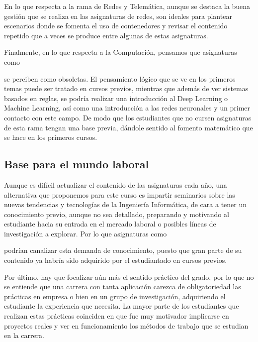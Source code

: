 En lo que respecta a la rama de Redes y Telemática,
aunque se destaca la buena gestión que se realiza en las asignaturas de redes,
son ideales para plantear escenarios donde se fomenta el uso de contenedores y
revisar el contenido repetido que
a veces se produce entre algunas de estas asignaturas.

Finalmente, en lo que respecta a la Computación,
pensamos que asignaturas como \subject{Sistemas inteligentes}
se perciben como obsoletas.
El pensamiento lógico que se ve en los primeros temas
puede ser tratado en cursos previos,
mientras que además de ver sistemas basados en reglas,
se podría realizar una introducción al Deep Learning o Machine Learning,
así como una introducción a las redes neuronales y
un primer contacto con este campo.
De modo que los estudiantes que no cursen asignaturas de esta rama
tengan una base previa,
dándole sentido al fomento matemático que se hace en los primeros cursos.

\subsection{Base para el mundo laboral}

Aunque es difícil actualizar el contenido de las asignaturas cada año,
una alternativa que proponemos para este curso es
impartir seminarios sobre las nuevas tendencias y tecnologías
de la Ingeniería Informática,
de cara a tener un conocimiento previo, aunque no sea detallado,
preparando y motivando al estudiante hacia su entrada en el mercado laboral o
posibles líneas de investigación a explorar.
Por lo que asignaturas como
\subject{Tecnologías Específicas de la Ingeniería Informática (TEII)}
podrían canalizar esta demanda de conocimiento,
puesto que gran parte de su contenido ya habría sido adquirido
por el estudiantado en cursos previos.

Por último, hay que focalizar aún más el sentido práctico del grado,
por lo que no se entiende que una carrera con tanta aplicación
carezca de obligatoriedad las prácticas en empresa
o bien en un grupo de investigación,
adquiriendo el estudiante la experiencia que necesita.
La mayor parte de los estudiantes que realizan estas prácticas coinciden en que
fue muy motivador implicarse en proyectos reales y
ver en funcionamiento los métodos de trabajo que se estudian en la carrera.


